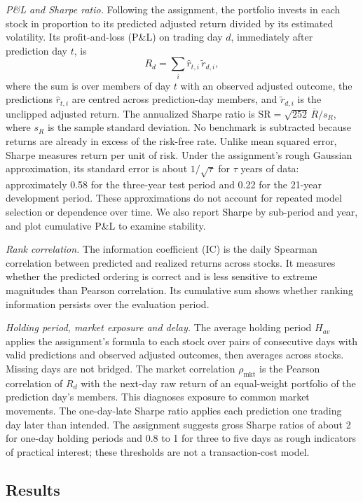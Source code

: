 \documentclass[conference]{IEEEtran}
\begin{document}
\textit{P\&L and Sharpe ratio.} Following the assignment, the portfolio invests in each stock in proportion to its predicted adjusted return divided by its estimated volatility. Its profit-and-loss (P\&L) on trading day $d$, immediately after prediction day $t$, is
\begin{equation}
R_d=\sum_i \hat r_{t,i}\,\tilde r_{d,i},
\end{equation}
where the sum is over members of day $t$ with an observed adjusted outcome, the predictions $\hat r_{t,i}$ are centred across prediction-day members, and $\tilde r_{d,i}$ is the unclipped adjusted return. The annualized Sharpe ratio is
$\mathrm{SR}=\sqrt{252}\,\overline R/s_R$,
where $s_R$ is the sample standard deviation. No benchmark is subtracted because returns are already in excess of the risk-free rate. Unlike mean squared error, Sharpe measures return per unit of risk. Under the assignment's rough Gaussian approximation, its standard error is about $1/\sqrt{\tau}$ for $\tau$ years of data: approximately 0.58 for the three-year test period and 0.22 for the 21-year development period. These approximations do not account for repeated model selection or dependence over time. We also report Sharpe by sub-period and year, and plot cumulative P\&L to examine stability.

\textit{Rank correlation.} The information coefficient (IC) is the daily Spearman correlation between predicted and realized returns across stocks. It measures whether the predicted ordering is correct and is less sensitive to extreme magnitudes than Pearson correlation. Its cumulative sum shows whether ranking information persists over the evaluation period.

\textit{Holding period, market exposure and delay.} The average holding period $H_{av}$ applies the assignment's formula to each stock over pairs of consecutive days with valid predictions and observed adjusted outcomes, then averages across stocks. Missing days are not bridged. The market correlation $\rho_{\mathrm{mkt}}$ is the Pearson correlation of $R_d$ with the next-day raw return of an equal-weight portfolio of the prediction day's members. This diagnoses exposure to common market movements. The one-day-late Sharpe ratio applies each prediction one trading day later than intended. The assignment suggests gross Sharpe ratios of about 2 for one-day holding periods and 0.8 to 1 for three to five days as rough indicators of practical interest; these thresholds are not a transaction-cost model.

\subsection{Results}
\label{sec:t3_results}
\end{document}
